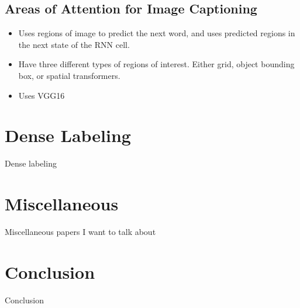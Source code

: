 \documentclass[10pt,twocolumn,letterpaper]{article}
\begin{document}
\subsection{Areas of Attention for Image Captioning}

\begin{itemize}
  \item Uses regions of image to predict the next word, and uses predicted
        regions in the next state of the RNN cell.
  \item Have three different types of regions of interest. Either grid, object
        bounding box, or spatial transformers.
  \item Uses VGG16
\end{itemize}

\section{Dense Labeling}

Dense labeling

\section{Miscellaneous}

Miscellaneous papers I want to talk about

\section{Conclusion}

Conclusion

{\small


}
\end{document}
